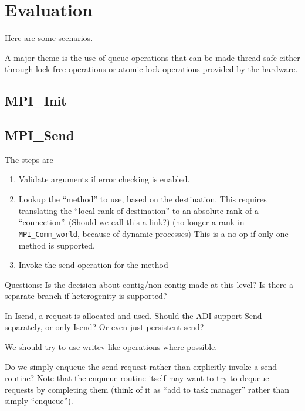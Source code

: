 \documentclass{article}
\let\code=\texttt
\begin{document}
\section{Evaluation}

Here are some scenarios.

A major theme is the use of queue operations that can be made thread safe
either 
through lock-free operations or atomic lock operations provided by the
hardware.  

\subsection{MPI\_Init}

\subsection{MPI\_Send}
The steps are
\begin{enumerate}
\item Validate arguments if error checking is enabled.
\item Lookup the ``method'' to use, based on the destination.  This requires
  translating the ``local rank of destination'' to an absolute rank of a
  ``connection''. (Should we call this a link?)  (no longer a rank in \code{MPI\_Comm\_world}, because of
  dynamic processes) This is a no-op
  if only one method is supported.
\item Invoke the send operation for the method
\end{enumerate}
Questions: Is the decision about contig/non-contig made at this level?
Is there a separate branch if heterogenity is supported?  

In Isend, a request is allocated and used.  Should the ADI support Send
separately, or only Isend?  Or even just persistent send?

We should try to use writev-like operations where possible.

Do we simply enqueue the send request rather than explicitly invoke a send
routine?  Note that the enqueue routine itself may want to try to dequeue
requests by completing them (think of it as ``add to task manager'' rather
than simply ``enqueue'').
\end{document}
